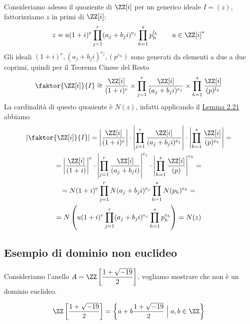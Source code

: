 \documentclass[11pt]{scrartcl}
\begin{document}
Consideriamo adesso il quoziente di $\ZZ[i]$ per un generico ideale $I = (z)$,
fattorizziamo $z$ in primi di $\ZZ[i]$:
\[
    z = u(1 + i)^e\prod_{j = 1}^r (a_j + b_j i)^{e_j}\prod_{h = 1}^s p_h^{l_h}
    \qquad u \in \ZZ[i]^*
\]
Gli ideali $(1 + i)^e, (a_j + b_ji)^{e_j}, (p^{e_h})$ sono generati da elementi a due a due coprimi,
quindi per il Teorema Cinese del Resto
\[
    \faktor{\ZZ[i]}{I} \cong \frac{\ZZ[i]}{(1 + i)^e}\times
    \prod_{j = 1}^r\frac{\ZZ[i]}{(a_j + b_ji)^{e_j}}
    \times \prod_{h = 1}^s \frac{\ZZ[i]}{(p)^{l_h}}
\]
La cardinalità di questo quoziente è $N(z)$, infatti applicando il 
\hyperref[lemma2.21]{Lemma 2.21} abbiamo
\begin{multline*}
    \left|\faktor{\ZZ[i]}{I}\right| = \left|\frac{\ZZ[i]}{(1 + i)^e}\right|\cdot
    \left|\prod_{j = 1}^r\frac{\ZZ[i]}{(a_j + b_ji)^{e_j}}\right|\cdot
    \left|\prod_{h = 1}^s \frac{\ZZ[i]}{(p)^{e_h}}\right| = \\
    = \left|\frac{\ZZ[i]}{(1 + i)}\right|^e\cdot
    \left|\prod_{j = 1}^r\frac{\ZZ[i]}{(a_j + b_ji)}\right|^{e_j}\cdot
    \left|\prod_{h = 1}^s \frac{\ZZ[i]}{(p)}\right|^{e_h} = \\
    = N(1 + i)^e\prod_{j = 1}^r N(a_j + b_ji)^{e_j}\prod_{h = 1}^s N(p_h)^{e_h} = \\
    = N\left(u(1 + i)^e\prod_{j = 1}^r (a_j + b_j i)^{e_j}\prod_{h = 1}^s p_h^{e_h}\right)
    = N(z)\\
\end{multline*}

\newpage

\subsection{Esempio di dominio non euclideo}

Consideriamo l'anello $\displaystyle A = \ZZ\left[\frac{1 + \sqrt{-19}}{2}\right]$,
vogliamo mostrare che non è un dominio euclideo. 

\begin{proposition}
    \[
        \ZZ\left[\frac{1 + \sqrt{-19}}{2}\right] = 
        \left\{a + b\frac{1 + \sqrt{-19}}{2}\Bigm| a, b \in \ZZ\right\}
    \]
\end{proposition}
\end{document}
